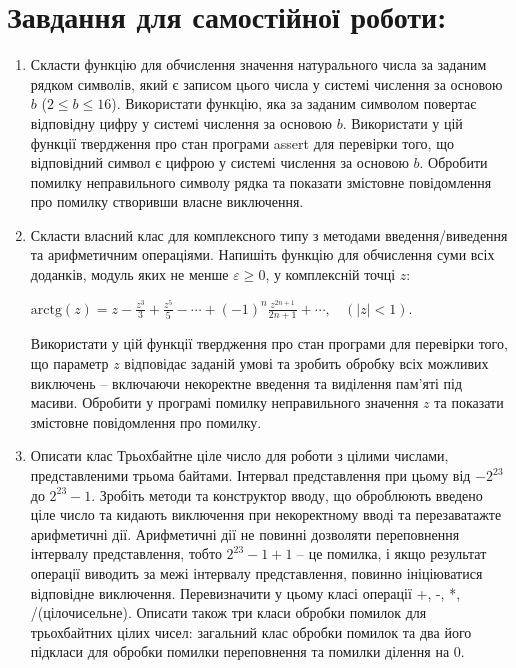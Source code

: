 \documentclass[a5paper,titlepage,openany,twoside,draft]{book_unv}%
\begin{document}
\section{Завдання для самостійної роботи:}
\begin{enumerate}
\def\labelenumi{\arabic{enumi})}
\setcounter{enumi}{2}
\item
Скласти функцію для обчислення значення натурального
числа за заданим рядком символів, який є записом цього числа у системі
числення за основою $b$ (\(2 \leq b \leq 16\)). Використати функцію, яка
за заданим символом повертає відповідну цифру у системі числення за
основою $b$. Використати у цій функції твердження про стан програми assert
для перевірки того, що відповідний символ є цифрою у системі числення за
основою $b$. Обробити помилку неправильного символу рядка та
показати змістовне повідомлення про помилку створивши власне виключення.

\item
Скласти власний клас для комплексного типу з методами введення/виведення 
та арифметичним операціями. Напишіть функцію для обчислення суми всіх доданків, модуль
яких не менше $\varepsilon \ge 0$, у комплексній точці $z$:

\(\text{arctg}\left( z \right) = z - \frac{z^{3}}{3} + \frac{z^{5}}{5} - \cdots + {(-1)}^{n}\frac{z^{2n+1}}{2n + 1} + \cdots,\ \ \ \ (\left| z \right| < 1)\).

Використати у цій функції твердження про стан програми для перевірки
того, що параметр $z$ відповідає заданій умові та зробить обробку
всіх можливих виключень -- включаючи некоректне введення та виділення
пам'яті під масиви. Обробити у програмі помилку неправильного значення
$z$ та показати змістовне повідомлення про помилку.

\item
Описати клас Трьохбайтне ціле число для роботи з цілими числами,
представленими трьома байтами. Інтервал представлення при цьому від
$-2^{23}$ до $2^{23}-1$. 
Зробіть методи та конструктор вводу, що оброблюють введено ціле число
та кидають виключення при некоректному вводі та перезаватажте арифметичні дії. 
Арифметичні дії не повинні дозволяти переповнення інтервалу представлення, 
тобто $2^{23}-1 + 1$ -- це помилка, і якщо результат операції виводить
 за межі інтервалу представлення, повинно
ініціюватися відповідне виключення. 
Перевизначити у цьому класі операції +, -, *, /(цілочисельне).
Описати також три класи обробки помилок для трьохбайтних цілих чисел:
загальний клас обробки помилок та два його підкласи для обробки помилки
переповнення та помилки ділення на 0.


\end{enumerate}
\end{document}
